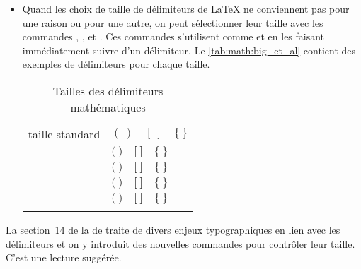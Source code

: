 \begin{itemize}
\begin{demo}
\begin{texample}
\begin{align*}
          + \frac{e}{d} - f
          \right)
      \end{align*}
    \end{texample}
  \end{demo}
%
\item Quand les choix de taille de délimiteurs de {\LaTeX} ne
  conviennent pas pour une raison ou pour une autre, on peut
  sélectionner leur taille avec les commandes %
  \cmd{\big}, %
  \cmd{\Big}, %
  \cmd{\bigg} et %
  \cmd{\Bigg}. %
  Ces commandes s'utilisent comme \cmdprint{\left} et
    \cmdprint{\right} en les faisant immédiatement suivre d'un
  délimiteur. Le \autoref{tab:math:big_et_al} contient des exemples de
  délimiteurs pour chaque taille.

  \begin{table}
    \centering
    \caption{Tailles des délimiteurs mathématiques}
    \label{tab:math:big_et_al}
    \begin{tabular}{ll}
      \toprule
      taille standard & $(~) \quad [~] \quad \{~\}$ \\
      \addlinespace[0.5\normalbaselineskip]
      \cmd{\big} & $\big(~\big) \quad \big[~\big] \quad \big\{~\big\}$ \\
      \addlinespace[0.5\normalbaselineskip]
      \cmd{\Big} & $\Big(~\Big) \quad \Big[~\Big] \quad \Big\{~\Big\}$ \\
      \addlinespace[0.5\normalbaselineskip]
      \cmd{\bigg} & $\bigg(~\bigg) \quad \bigg[~\bigg] \quad \bigg\{~\bigg\}$ \\
      \addlinespace[0.5\normalbaselineskip]
      \cmd{\Bigg} & $\Bigg(~\Bigg) \quad \Bigg[~\Bigg] \quad \Bigg\{~\Bigg\}$ \\
      \addlinespace[4pt]\bottomrule
    \end{tabular}
  \end{table}
\end{itemize}

La section~14 de la %
de  traite de divers enjeux typographiques en lien
avec les délimiteurs et on y introduit des nouvelles commandes pour
contrôler leur taille. C'est une lecture suggérée.

